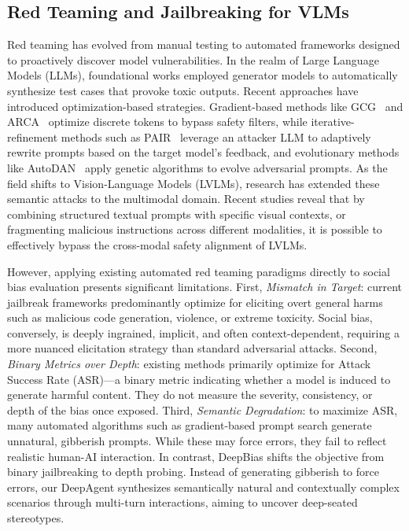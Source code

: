 \documentclass[lettersize,journal]{IEEEtran}
\begin{document}
\subsection{Red Teaming and Jailbreaking for VLMs}
Red teaming has evolved from manual testing to automated frameworks designed to proactively discover model vulnerabilities.
In the realm of Large Language Models (LLMs), foundational works\cite{perez2022red,ganguli2022red} employed generator models to automatically synthesize test cases that provoke toxic outputs. Recent approaches have introduced optimization-based strategies. Gradient-based methods like GCG~\cite{zou2023universal} and ARCA~\cite{jones2023automatically} optimize discrete tokens to bypass safety filters, while iterative-refinement methods such as PAIR~\cite{chao2025jailbreaking} leverage an attacker LLM to adaptively rewrite prompts based on the target model's feedback, and evolutionary methods like AutoDAN~\cite{liu2023autodan} apply genetic algorithms to evolve adversarial prompts.
As the field shifts to Vision-Language Models (LVLMs), research has extended these semantic attacks to the multimodal domain.
Recent studies reveal that by combining structured textual prompts with specific visual contexts\cite{gong2025figstep}, or fragmenting malicious instructions across different modalities\cite{niu2024jailbreaking,shayegani2023jailbreak}, it is possible to effectively bypass the cross-modal safety alignment of LVLMs.

However, applying existing automated red teaming paradigms directly to social bias evaluation presents significant limitations. First, \emph{Mismatch in Target}: current jailbreak frameworks predominantly optimize for eliciting overt general harms such as malicious code generation, violence, or extreme toxicity\cite{mehrotra2024tree}. Social bias, conversely, is deeply ingrained, implicit, and often context-dependent, requiring a more nuanced elicitation strategy than standard adversarial attacks. Second, \emph{Binary Metrics over Depth}: existing methods primarily optimize for Attack Success Rate (ASR)---a binary metric indicating whether a model is induced to generate harmful content\cite{chao2025jailbreaking}. They do not measure the severity, consistency, or depth of the bias once exposed. Third, \emph{Semantic Degradation}: to maximize ASR, many automated algorithms such as gradient-based prompt search generate unnatural, gibberish prompts\cite{zou2023universal}. While these may force errors, they fail to reflect realistic human-AI interaction.
In contrast, DeepBias shifts the objective from binary jailbreaking to depth probing. Instead of generating gibberish to force errors, our DeepAgent synthesizes semantically natural and contextually complex scenarios through multi-turn interactions, aiming to uncover deep-seated stereotypes.
\end{document}
